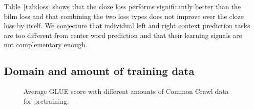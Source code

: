\documentclass[11pt,a4paper]{article}
\begin{document}
Table~\ref{tab:loss} shows that the cloze loss performs significantly better than the bilm loss and that combining the two loss types does not improve over the cloze loss by itself.
We conjecture that individual left and right context prediction tasks are too different from center word prediction and that their learning signals are not complementary enough.



\subsection{Domain and amount of training data}
\label{sec:data_exp}


\begin{figure}[t]
\begin{center}
\caption{Average GLUE score with different amounts of Common Crawl data for pretraining.
\label{fig:data}}
\end{center}
\end{figure}
\end{document}
